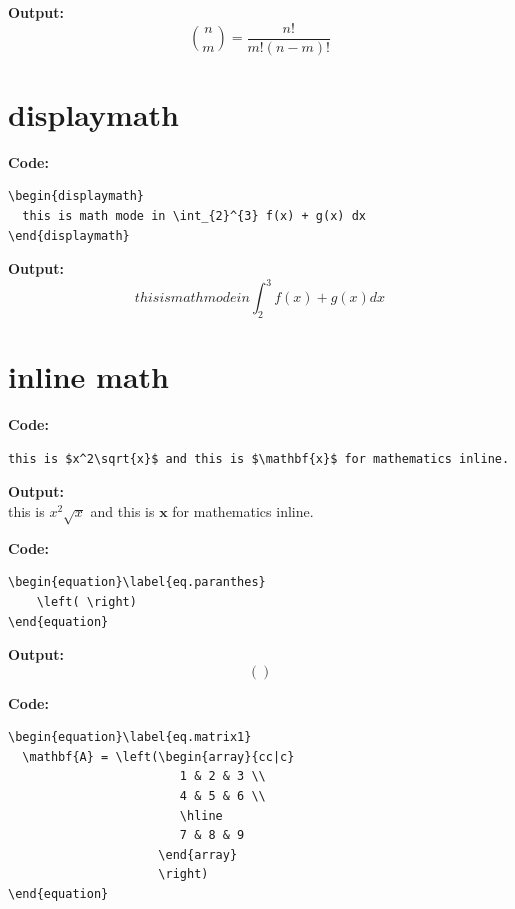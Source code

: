 \documentclass{book}
\newcommand{\myc}{\noindent\textbf{{\color{blue} Code}:}}
\newcommand{\myo}{\noindent\textbf{{\color{blue} Output}:\\}}
\begin{document}
\myo
\begin{equation}\label{eq.combination}
  \binom{n}{m} = \frac{n!}{m!(n-m)!}
\end{equation}

\section{displaymath}
\myc
\begin{lstlisting}
\begin{displaymath}
  this is math mode in \int_{2}^{3} f(x) + g(x) dx
\end{displaymath}
\end{lstlisting}

\myo
\begin{displaymath}
  this is math mode in \int_{2}^{3} f(x) + g(x) dx
\end{displaymath}

\section{inline math}
\myc
\begin{lstlisting}
this is $x^2\sqrt{x}$ and this is $\mathbf{x}$ for mathematics inline.
\end{lstlisting}

\myo
this is $x^2\sqrt{x}$ and this is $\mathbf{x}$ for mathematics inline.

\myc
\begin{lstlisting}
\begin{equation}\label{eq.paranthes}
    \left( \right)
\end{equation}
\end{lstlisting}

\myo
\begin{equation}\label{eq.paranthes}
    \left( \right)
\end{equation}


\myc
\begin{lstlisting}
\begin{equation}\label{eq.matrix1}
  \mathbf{A} = \left(\begin{array}{cc|c}
                        1 & 2 & 3 \\
                        4 & 5 & 6 \\
                        \hline
                        7 & 8 & 9
                     \end{array}
                     \right)
\end{equation}
\end{lstlisting}
\end{document}
